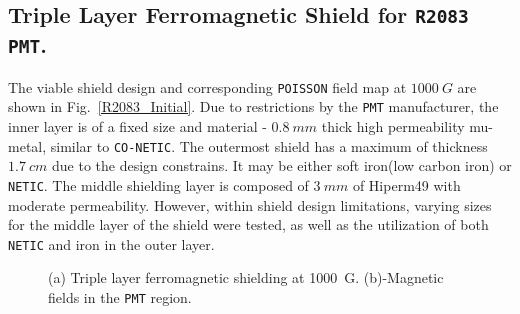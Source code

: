 \documentclass[12pt]{article}
\begin{document}
\subsection{Triple Layer Ferromagnetic Shield for {\tt R2083} {\tt PMT}.}
\label{sec:tlfs}

The viable  shield design  and  corresponding  {\tt POISSON} 
field map at $1000~G$ are shown  in Fig.~\ref{R2083_Initial}.
Due to restrictions by the {\tt PMT} manufacturer, the inner layer 
is of a fixed size and material - $0.8~mm$ thick 
high permeability mu-metal, similar to  {\tt CO-NETIC}. 
The outermost shield has a maximum of thickness  $1.7~cm$ due to 
the design constrains. It may be either  soft iron(low carbon iron) 
or {\tt NETIC}.
The middle shielding 
layer is composed of $3~mm$ of Hiperm49 with moderate permeability. 
However, within shield design  limitations, 
varying sizes for the middle layer of 
the shield were tested, as well as the 
utilization of both {\tt NETIC} 
and iron in the outer layer.
 

\begin{figure}[ht]
\centering
{}
\qquad
{}
\qquad
\caption{\small{(a) Triple layer ferromagnetic shielding at 1000~G.
(b)-Magnetic fields in the {\tt PMT} region.}}\label{R2083_Initial_Iron}
\end{figure}
\end{document}

